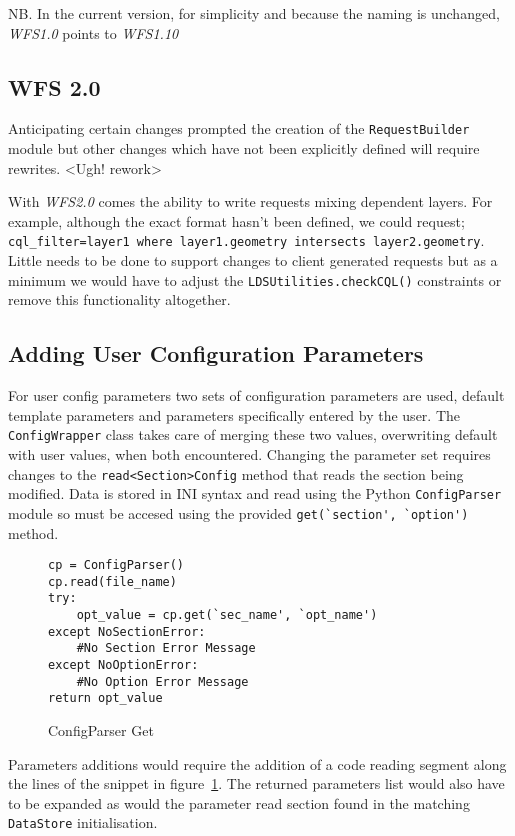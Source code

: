 \documentclass[a4paper]{report}
\begin{document}
NB. In the current version, for simplicity and because the naming is unchanged,
\emph{WFS1.0} points to \emph{WFS1.10}


 \subsection*{WFS 2.0}
Anticipating certain changes prompted the creation of the 
\lstinline|RequestBuilder| module but other changes which have not been
explicitly defined will require rewrites. <Ugh! rework>

With \emph{WFS2.0} comes the ability to write requests mixing dependent layers.
For example, although the exact format hasn't been defined, we could request;
\lstinline|cql_filter=layer1 where layer1.geometry intersects layer2.geometry|.
Little needs to be done to support changes to client generated requests but as a
minimum we would have to adjust the \lstinline|LDSUtilities.checkCQL()| constraints or remove this functionality altogether.

\subsection*{Adding User Configuration Parameters}
For user config parameters two sets of configuration parameters are used,
default template parameters and parameters specifically entered by the user. The
\lstinline|ConfigWrapper| class takes care of merging these two values,
overwriting default with user values, when both encountered.
Changing the parameter set requires changes to the
\lstinline|read<Section>Config| method that reads the section being
modified. Data is stored in INI syntax and read using the Python
\lstinline|ConfigParser| module so must be accesed using the provided
\lstinline|get(`section', `option')| method.

\begin{figure}
\begin{lstlisting}
cp = ConfigParser()
cp.read(file_name)
try:
	opt_value = cp.get(`sec_name', `opt_name')
except NoSectionError:
    #No Section Error Message
except NoOptionError:
    #No Option Error Message
return opt_value
\end{lstlisting}
\caption{ConfigParser Get}
\label{fig:ConfigParserGet}
\end{figure}

Parameters additions would require the addition of  a code reading segment along
the lines of the snippet in figure~\ref{fig:ConfigParserGet}. The returned
parameters list would also have to be expanded as would the parameter read
section found in the matching \lstinline|DataStore| initialisation.
\end{document}
